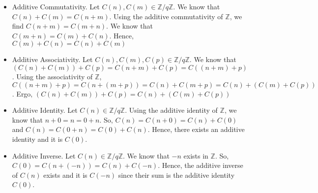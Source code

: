 \documentclass[12pt]{article}
\begin{document}
\begin{enumerate}[start=1,label={\bfseries Problem \arabic*:},leftmargin=1in]
\begin{enumerate}
\begin{itemize}
            \item Additive Commutativity. Let $C(n), C(m) \in \mathbb{Z}/q\mathbb{Z}$.
            We know that $C(n) + C(m) = C(n + m)$. Using the additive commutativity of $\mathbb{Z}$, we find 
            $C(n + m) = C(m + n)$. We know that $C(m + n) = C(m) + C(n)$. Hence, $C(m)+C(n) = C(n)+C(m)$
            \item Additive Associativity. Let $C(n), C(m), C(p) \in \mathbb{Z}/q\mathbb{Z}$. 
            We know that $(C(n) + C(m)) + C(p) = C(n + m) + C(p) = C((n + m) + p)$. Using the associativity of $\mathbb{Z}$, 
            $C((n+m) + p) = C(n + (m + p)) = C(n) + C(m + p) = C(n) + (C(m) + C(p))$. Ergo, $(C(n) + C(m)) + C(p) = C(n) + (C(m)+C(p))$ 
            \item Additive Identity. Let $C(n) \in \mathbb{Z}/q\mathbb{Z}$. Using the additive identity of $\mathbb{Z}$, 
            we know that $n + 0 = n = 0 + n$. So, $C(n) = C(n + 0) = C(n) + C(0)$ and $C(n) = C(0 + n) = C(0) + C(n)$. Hence, there exists an additive identity and it is $C(0)$. 
            \item Additive Inverse. Let $C(n) \in \mathbb{Z}/q\mathbb{Z}$. We know that $-n$ exists in $\mathbb{Z}$. So, 
            $C(0) = C(n + (-n)) = C(n) + C(-n)$. Hence, the additive inverse of $C(n)$ exists and it is $C(-n)$ since their sum is the additive identity $C(0)$. 


\end{itemize}
\end{enumerate}
\end{enumerate}
\end{document}
